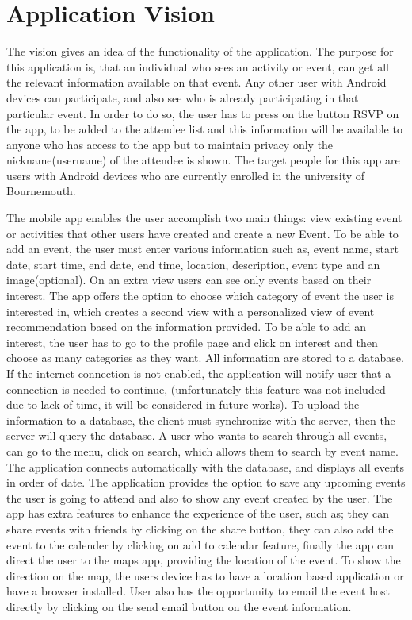 \section{Application Vision}
\label{app vision}
The vision gives an idea of the functionality of the application.
The purpose for this application is, that an individual who sees an activity or event, can get all the relevant information available on that event.  Any other user with Android devices can participate, and also see who is already participating in that particular event. In order to do so, the user has to press on the button RSVP on the app, to be added to the attendee list and this information will be available to anyone who has access to the app but to maintain privacy only the nickname(username) of the attendee is shown. The target people for this app are users with Android devices who are currently enrolled in the university of Bournemouth.

The mobile app enables the user accomplish two main things: view existing event or activities that other users have created and create a new Event. To be able to add an event, the user must enter various information such as, event name, start date, start time, end date, end time, location, description, event type and an image(optional). On an extra view users can see only events based on their interest. The app offers the option to choose which category of event the user is interested in, which creates a second view with a personalized view of event recommendation based on the information provided. To be able to add an interest, the user has to go to the profile page and click on interest and then choose as many categories as they want. All information are stored to a database. If the internet connection is not enabled, the application will notify user that a connection is needed to continue, (unfortunately this feature was not included due to lack of time, it will be considered in future works). To upload the information to a database, the client must synchronize with the server, then the server will query the database. A user who wants to search through all events, can go to the menu, click on search, which allows them to search by event name. The application connects automatically with the database, and displays all events in order of date. The application provides the option to  save any upcoming events the user is going to attend and also to show any event created by the user. The app has extra features to enhance the experience of the user, such as; they can share events with friends by clicking on the share button, they can also add the event to the calender by clicking on add to calendar feature, finally the app can direct the user to the maps app, providing the location of the event. To show the direction on the map, the users device has to have a location based application or have a browser installed. User also has the opportunity to email the event host directly by clicking on the send email button on the event information.

